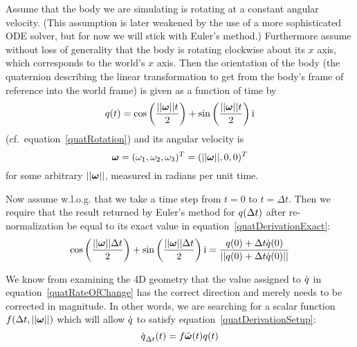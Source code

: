 Assume that the body we are simulating is rotating at a constant angular velocity.
(This assumption is later weakened by the use of a more sophisticated ODE solver,
but for now we will stick with Euler's method.) Furthermore assume without loss of
generality that the body is rotating clockwise about its $x$ axis, which corresponds
to the world's $x$ axis. Then the orientation of the body (the quaternion describing
the linear transformation to get from the body's frame of reference into the world
frame) is given as a function of time by
\begin{equation}
\label{quatDerivationExact}
\q{q}(t) = \cos\left(\frac{\norm{\ve{\omega}}t}{2}\right) +
    \sin\left(\frac{\norm{\ve{\omega}}t}{2}\right)\qi
\end{equation}
(cf.\ equation~\ref{quatRotation}) and its angular velocity is
\begin{equation}
\ve{\omega} = (\omega_1, \omega_2, \omega_3)^T = (\norm{\ve{\omega}}, 0, 0)^T
\end{equation}
for some arbitrary $\norm{\ve{\omega}}$, measured in radians per unit time.

Now assume w.l.o.g. that we take a time step from $t = 0$ to $t = \Delta t$.
Then we require that the result returned by Euler's method for $\mbox{$q$}(\Delta t)$
after re-normalization be equal to its exact value in equation~\ref{quatDerivationExact}:
\begin{equation}
\label{quatDerivationSetup}
\cos\left(\frac{\norm{\ve{\omega}}\Delta t}{2}\right) +
    \sin\left(\frac{\norm{\ve{\omega}}\Delta t}{2}\right)\qi =
    \frac{\q{q}(0) + \Delta t \dot{\q{q}}(0)}
        {\norm{\q{q}(0) + \Delta t \dot{\q{q}}(0)}}
\end{equation}

We know from examining the 4D geometry that the value assigned to $\dot{\mbox{$q$}}$
in equation~\ref{quatRateOfChange} has the correct direction and merely needs to be
corrected in magnitude. In other words, we are searching for a scalar function
$f(\Delta t, \norm{\ve{\omega}})$ which will allow $\dot{\mbox{$q$}}$ to satisfy
equation~\ref{quatDerivationSetup}:
\begin{equation}
\dot{\q{q}}_{\Delta t}(t) = f\tilde{\ve{\omega}}(t)\q{q}(t)
\end{equation}

